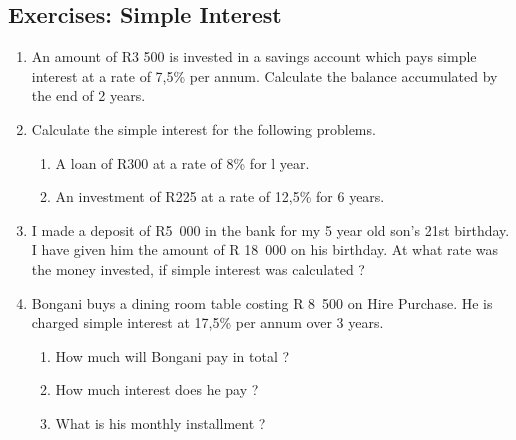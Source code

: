 \label{m39332*secfhsst!!!underscore!!!id1753}
            \subsection{Exercises: Simple Interest }
            \nopagebreak
            \label{m39332*id71818}\begin{enumerate}[noitemsep, label=\textbf{\arabic*}. ] 
            \label{m39332*uid49}\item An amount of R3 500 is invested in a savings account which pays simple interest at a rate of 7,5\% per annum. Calculate the balance accumulated by the end of 2 years.\newline
    
        
\label{m39332*uid50}\item Calculate the simple interest for the following problems.
\label{m39332*id71847}\begin{enumerate}[noitemsep, label=\textbf{\alph*}. ] 
            \label{m39332*uid51}\item A loan of R300 at a rate of 8\% for l year.
\label{m39332*uid52}\item An investment of R225 at a rate of 12,5\% for 6 years.
\end{enumerate}
                
\label{m39332*uid53}\item I made a deposit of R5~000 in the bank for my 5 year old son's 21st birthday. I have given him the amount of R 18~000 on his birthday. At what rate was the money invested, if simple interest was calculated ?\newline
    
        
\label{m39332*uid54}\item Bongani buys a dining room table costing R 8~500 on Hire Purchase. He is charged simple interest at 17,5\% per annum over 3 years.
\label{m39332*id71906}\begin{enumerate}[noitemsep, label=\textbf{\alph*}. ] 
            \label{m39332*uid55}\item How much will Bongani pay in total ?
\label{m39332*uid56}\item How much interest does he pay ?
\label{m39332*uid57}\item What is his monthly installment ?
\end{enumerate}
        
        
\end{enumerate}
        
        

